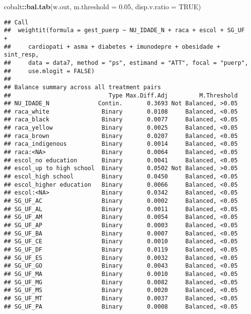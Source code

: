 \documentclass[
]{article}
\newenvironment{Shaded}{\begin{snugshade}}{\end{snugshade}}
\newcommand{\DataTypeTok}[1]{\textcolor[rgb]{0.13,0.29,0.53}{#1}}
\newcommand{\FloatTok}[1]{\textcolor[rgb]{0.00,0.00,0.81}{#1}}
\newcommand{\KeywordTok}[1]{\textcolor[rgb]{0.13,0.29,0.53}{\textbf{#1}}}
\newcommand{\NormalTok}[1]{#1}
\newcommand{\OperatorTok}[1]{\textcolor[rgb]{0.81,0.36,0.00}{\textbf{#1}}}
\newcommand{\OtherTok}[1]{\textcolor[rgb]{0.56,0.35,0.01}{#1}}
\begin{document}
\begin{Shaded}
\begin{Highlighting}[]
\NormalTok{cobalt}\OperatorTok{::}\KeywordTok{bal.tab}\NormalTok{(w.out, }\DataTypeTok{m.threshold =} \FloatTok{0.05}\NormalTok{, }\DataTypeTok{disp.v.ratio =} \OtherTok{TRUE}\NormalTok{)}
\end{Highlighting}
\end{Shaded}

\begin{verbatim}
## Call
##  weightit(formula = gest_puerp ~ NU_IDADE_N + raca + escol + SG_UF + 
##     cardiopati + asma + diabetes + imunodepre + obesidade + sint_resp, 
##     data = data7, method = "ps", estimand = "ATT", focal = "puerp", 
##     use.mlogit = FALSE)
## 
## Balance summary across all treatment pairs
##                            Type Max.Diff.Adj         M.Threshold
## NU_IDADE_N              Contin.       0.3693 Not Balanced, >0.05
## raca_white               Binary       0.0108     Balanced, <0.05
## raca_black               Binary       0.0077     Balanced, <0.05
## raca_yellow              Binary       0.0025     Balanced, <0.05
## raca_brown               Binary       0.0207     Balanced, <0.05
## raca_indigenous          Binary       0.0014     Balanced, <0.05
## raca:<NA>                Binary       0.0064     Balanced, <0.05
## escol_no education       Binary       0.0041     Balanced, <0.05
## escol_up to high school  Binary       0.0502 Not Balanced, >0.05
## escol_high school        Binary       0.0450     Balanced, <0.05
## escol_higher education   Binary       0.0066     Balanced, <0.05
## escol:<NA>               Binary       0.0342     Balanced, <0.05
## SG_UF_AC                 Binary       0.0002     Balanced, <0.05
## SG_UF_AL                 Binary       0.0011     Balanced, <0.05
## SG_UF_AM                 Binary       0.0054     Balanced, <0.05
## SG_UF_AP                 Binary       0.0003     Balanced, <0.05
## SG_UF_BA                 Binary       0.0007     Balanced, <0.05
## SG_UF_CE                 Binary       0.0010     Balanced, <0.05
## SG_UF_DF                 Binary       0.0119     Balanced, <0.05
## SG_UF_ES                 Binary       0.0032     Balanced, <0.05
## SG_UF_GO                 Binary       0.0043     Balanced, <0.05
## SG_UF_MA                 Binary       0.0010     Balanced, <0.05
## SG_UF_MG                 Binary       0.0082     Balanced, <0.05
## SG_UF_MS                 Binary       0.0020     Balanced, <0.05
## SG_UF_MT                 Binary       0.0037     Balanced, <0.05
## SG_UF_PA                 Binary       0.0008     Balanced, <0.05

\end{verbatim}
\end{document}
